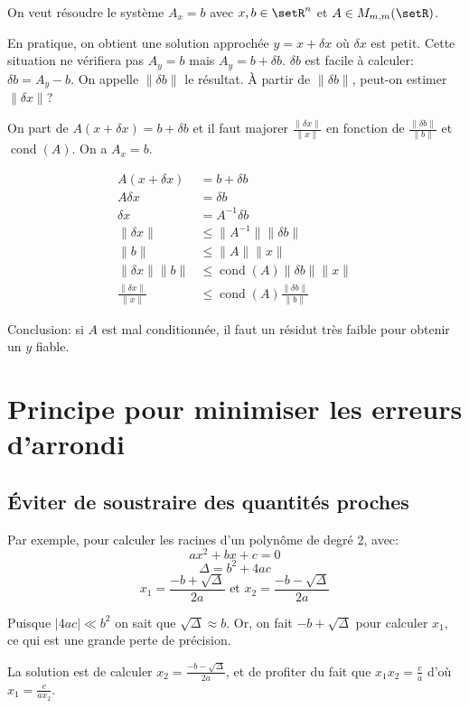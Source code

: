 \documentclass[a4paper,10pt,french,openany]{memoir}
\newcommand{\norm}[1]{\lVert#1\rVert}
\newcommand{\normfrac}[2]{\frac{\norm{#1}}{\norm{#2}}}
\DeclareMathOperator{\cond}{cond}
\begin{document}
On veut résoudre le système $A_x = b$ avec $x, b \in \setR^n$ et $A \in M_{m,m}(\setR)$.

En pratique, on obtient une solution approchée $y = x + \delta x$ où $\delta x$ est petit. Cette situation ne vérifiera pas $A_y = b$ mais $A_y = b + \delta b$. $\delta b$ est facile à calculer: $\delta b = A_y - b$. On appelle $\norm{\delta b}$ le résultat. À partir de $\norm{\delta b}$, peut-on estimer $\norm{\delta x}$?

On part de $A(x+\delta x) = b + \delta b$ et il faut majorer $\normfrac{\delta x}{x}$ en fonction de $\normfrac{\delta b}{b}$ et $\cond(A)$. On a $A_x = b$.

\begin{align*}
  A(x+\delta x) &= b+\delta b \\
  A\delta x &= \delta b \\
  \delta x &= A^{-1} \delta b \\
  \norm{\delta x} &\leq \norm{A^{-1}} \norm{\delta b} \\
  \norm{b} &\leq \norm{A} \norm{x} \\
  \norm{\delta x} \norm{b} &\leq \cond(A) \norm{\delta b} \norm{x} \\
  \normfrac{\delta x}{x} &\leq \cond(A) \normfrac{\delta b}{b}
\end{align*}

Conclusion: si $A$ est mal conditionnée, il faut un résidut très faible pour obtenir un $y$ fiable.

\section{Principe pour minimiser les erreurs d'arrondi}

\subsection{Éviter de soustraire des quantités proches}

Par exemple, pour calculer les racines d'un polynôme de degré 2, avec:
\[a x^2 + b x + c = 0\]
\[\Delta = b^2 + 4 a c\]
\[x_1 = \frac{-b+\sqrt{\Delta}}{2 a} \text{ et } x_2 = \frac{-b-\sqrt{\Delta}}{2 a}\]

Puisque $\left|4 a c\right| \ll b^2$ on sait que $\sqrt{\Delta} \approx b$. Or, on fait $-b+\sqrt{\Delta}$ pour calculer $x_1$, ce qui est une grande perte de précision.

La solution est de calculer $x_2 = \frac{-b-\sqrt{\Delta}}{2 a}$, et de profiter du fait que $x_1 x_2 = \frac c a$ d'où $x_1 = \frac c {a x_2}$.
\end{document}
